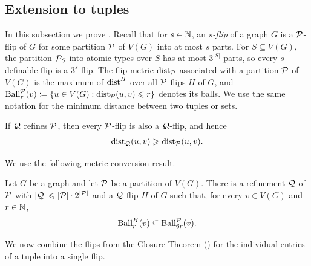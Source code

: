 \subsection{Extension to tuples}\label{sec:closures-tuples}
In this subsection we prove .
Recall that for $s\in\mathbb N$, an \emph{$s$-flip} of a graph $G$ is a $\mathcal P$-flip of $G$ for some partition $\mathcal P$ of $V(G)$ into at most $s$ parts.
For $S\subseteq V(G)$, the partition $\mathcal P_S$ into atomic types over $S$ has at most $3^{|S|}$ parts, so every $s$-definable flip is a $3^s$-flip.
The flip metric $\mathrm{dist}_\mathcal P$ associated with a partition $\mathcal P$ of $V(G)$ is the maximum of $\mathrm{dist}^H$ over all $\mathcal P$-flips $H$ of $G$, and $\operatorname{Ball}^\mathcal P_r(v)\coloneqq\{u\in V(G):\mathrm{dist}_\mathcal P(u,v)\leqslant r\}$ denotes its balls.
We use the same notation for the minimum distance between two tuples or sets.

\begin{observation}\label{obs:partition-distance-monotone}
If $\mathcal Q$ refines $\mathcal P$, then every $\mathcal P$-flip is also a $\mathcal Q$-flip, and hence
\[
    \mathrm{dist}_\mathcal Q(u,v)\geqslant \mathrm{dist}_\mathcal P(u,v).
\]
\end{observation}

We use the following metric-conversion result.    

\begin{lemma}\label{lem:partition-metric-conversion}
    Let $G$ be a graph and let $\mathcal P$ be a partition of $V(G)$. There is a refinement $\mathcal Q$ of $\mathcal P$ with $|\mathcal Q|\leqslant |\mathcal P|\cdot 2^{|\mathcal P|}$ and a $\mathcal Q$-flip $H$ of $G$ such that, for every $v\in V(G)$ and $r\in\mathbb N$,
    \[
        \operatorname{Ball}^H_r(v)\subseteq\operatorname{Ball}^\mathcal P_{6r}(v).
    \]
\end{lemma}

We now combine the flips from  the Closure Theorem () for the individual entries of a tuple into a single flip.

\thmClosuresTuples*


